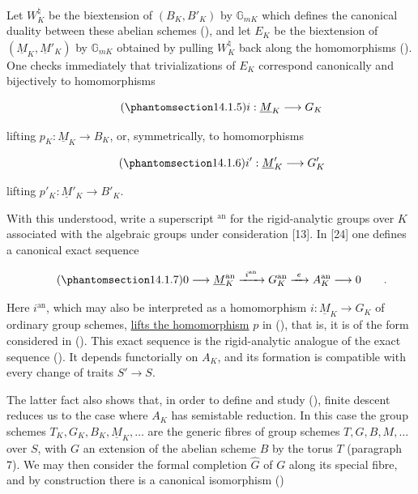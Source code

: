 Let $W_K^{\natural}$ be the biextension of $(B_K,B'_K)$ by
$\mathbb G_{mK}$ which defines the canonical duality between these
abelian schemes (), and let $E_K$ be the biextension of
$(\underline M_K,\underline M'_K)$ by $\mathbb G_{mK}$ obtained by
pulling $W_K^{\natural}$ back along the homomorphisms ().  One
checks immediately that trivializations of $E_K$ correspond
canonically and bijectively to homomorphisms

\begin{equation}\tag{\SGARefTarget{sga7.sga7i.eix.n14-1-5}{14.1.5}}
 i:\underline M_K\longrightarrow G_K
\end{equation}

\noindent
lifting $p_K:\underline M_K\longrightarrow B_K$, or, symmetrically, to
homomorphisms

\begin{equation}\tag{\SGARefTarget{sga7.sga7i.eix.n14-1-6}{14.1.6}}
 i':\underline M'_K\longrightarrow G'_K
\end{equation}

\noindent
lifting $p'_K:\underline M'_K\longrightarrow B'_K$.

With this understood, write a superscript ${}^{\mathrm{an}}$ for the
rigid-analytic groups over $K$ associated with the algebraic groups
under consideration [13].  In [24] one defines a canonical exact
sequence

\begin{equation}\tag{\SGARefTarget{sga7.sga7i.eix.n14-1-7}{14.1.7}}
 0\longrightarrow\underline M_K^{\mathrm{an}}
 \xrightarrow{\ i^{\mathrm{an}}\ }G_K^{\mathrm{an}}
 \xrightarrow{\ e\ }A_K^{\mathrm{an}}\longrightarrow0\qquad .
\end{equation}

\noindent
Here $i^{\mathrm{an}}$, which may also be interpreted as a homomorphism
$i:\underline M_K\longrightarrow G_K$ of ordinary group schemes,
\underline{lifts the homomorphism} $p$ in (), that is, it is of
the form considered in ().  This exact sequence is the
rigid-analytic analogue of the exact sequence ().  It depends
functorially on $A_K$, and its formation is compatible with every
change of traits $S'\longrightarrow S$.

The latter fact also shows that, in order to define and study (),
finite descent reduces us to the case where $A_K$ has semistable
reduction.  In this case the group schemes
$T_K,G_K,B_K,\underline M_K,\ldots$ are the generic fibres of group
schemes $T,G,B,M,\ldots$ over $S$, with $G$ an extension of the abelian
scheme $B$ by the torus $T$ (paragraph 7).  We may then consider the
formal completion $\hat G$ of $G$ along its special fibre, and by
construction there is a canonical isomorphism ()

